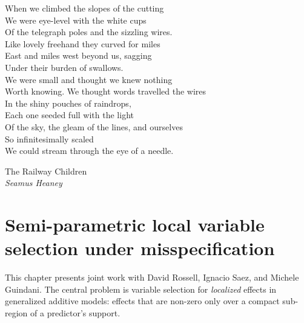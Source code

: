 \epigraph{When we climbed the slopes of the cutting\\
We were eye-level with the white cups\\
Of the telegraph poles and the sizzling wires.\\[2ex]

Like lovely freehand they curved for miles\\
East and miles west beyond us, sagging\\
Under their burden of swallows.\\[2ex]

We were small and thought we knew nothing\\
Worth knowing. We thought words travelled the wires\\
In the shiny pouches of raindrops,\\[2ex]

Each one seeded full with the light\\
Of the sky, the gleam of the lines, and ourselves\\
So infinitesimally scaled\\[2ex]

We could stream through the eye of a needle.}{The Railway Children \\ \textit{Seamus Heaney}}

\chapter{Semi-parametric local variable selection under misspecification}
\label{chap:semipar}


This chapter presents joint work with David Rossell, Ignacio Saez, and Michele Guindani.
The central problem is variable selection for \emph{localized} effects
in generalized additive models: effects that are non-zero only over a
compact sub-region of a predictor's support. 

